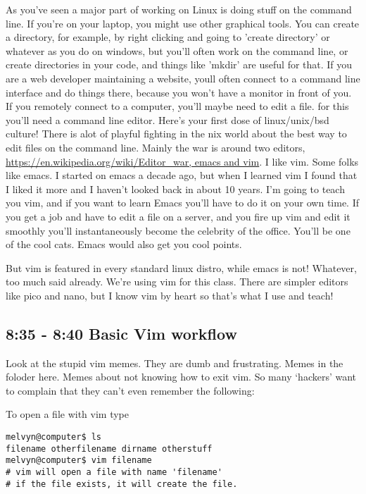 \documentclass[10pt]{article}
\begin{document}
As you've seen a major part of working on Linux is doing stuff on the command line. 
If you're on your laptop, you might use other graphical tools. You can create a directory, for example, by right clicking and going to 'create directory' or whatever as you do on windows, but you'll often work on the command line, or create directories in your code, and things like 'mkdir' are useful for that. 
If you are a web developer maintaining a website, youll often connect to a command line interface and do things there, because you won't have a monitor in front of you. 
If you remotely connect to a computer, you'll maybe need to edit a file. for
this you'll need a command line editor. Here's your first dose of linux/unix/bsd
culture! There is alot of playful fighting in the \*nix world about the best way
to edit files on the command line. Mainly the war is around two editors,
\url{https://en.wikipedia.org/wiki/Editor_war, emacs and vim}. I like vim. Some folks like emacs. I started on emacs a decade ago, but when I learned vim I found that I liked it more and I haven't looked back in about 10 years. I'm going to teach you vim, and if you want to learn Emacs you'll have to do it on your own time. 
If you get a job and have to edit a file on a server, and you fire up vim and edit it smoothly you'll instantaneously become the celebrity of the office. You'll be one of the cool cats. Emacs would also get you cool points.

But vim is featured in every standard linux distro, while emacs is not! 
Whatever, too much said already. We're using vim for this class.
There are simpler editors like pico and nano, but I know vim by heart so that's what I use and teach!

\subsection*{8:35 - 8:40 Basic Vim workflow}
Look at the stupid vim memes. They are dumb and frustrating. Memes in the
foloder here. Memes about not knowing how to exit vim. So many `hackers'
want to complain that they can't even remember the following:

To open a file with vim type

\begin{lstlisting}[style=term]
melvyn@computer$ ls
filename otherfilename dirname otherstuff
melvyn@computer$ vim filename
# vim will open a file with name 'filename'
# if the file exists, it will create the file.
\end{lstlisting}
\end{document}
